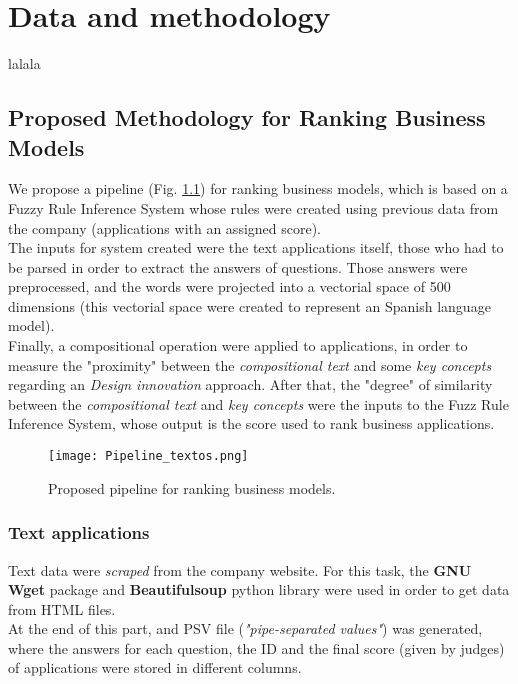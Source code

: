 
\chapter{Data and methodology}
\label{ch:methodology}

lalala

\section{Proposed Methodology for Ranking Business Models}
%
  We propose a pipeline (Fig. \ref{fig:pipeline}) for ranking business models, which is based on a Fuzzy Rule Inference System whose rules were created using previous data from the company (applications with an assigned score). \\
 The inputs for system created were the text applications itself, those who had to be parsed in order to extract the answers of questions. Those answers were preprocessed, and the words were projected into a vectorial space of 500 dimensions (this vectorial space were created to represent an Spanish language model). \\
 Finally, a compositional operation were applied to applications, in order to measure the "proximity" between the \textit{compositional text} and some \textit{key concepts} regarding an \textit{Design innovation} approach. After that, the "degree" of similarity between the \textit{compositional text} and \textit{key concepts} were the inputs to the Fuzz Rule Inference System, whose output is the score used to rank business applications. 
 
\begin{figure}[h]
	\label{fig:pipeline}
	\texttt{[image: Pipeline\_textos.png]}
    \caption{Proposed pipeline for ranking business models.}
\end{figure}

\subsection{Text applications}
Text data were \textit{scraped} from the company website. For this task, the \textbf{GNU Wget} package and \textbf{Beautifulsoup} python library were used in order to get data from HTML files. \\
At the end of this part, and PSV file (\textit{"pipe-separated values"}) was generated, where the answers for each question,  the ID and the final score (given by judges) of applications were stored in different columns.

